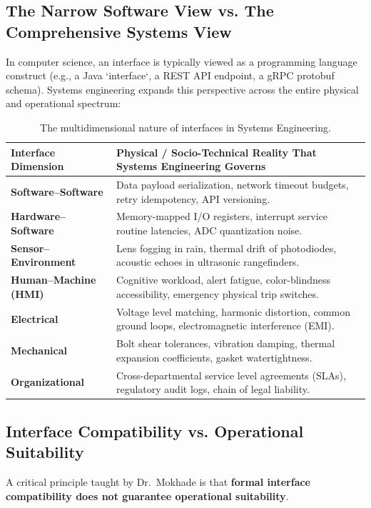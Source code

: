 \subsection{The Narrow Software View vs. The Comprehensive Systems View}
In computer science, an interface is typically viewed as a programming language construct (e.g., a Java `interface`, a REST API endpoint, a gRPC protobuf schema). Systems engineering expands this perspective across the entire physical and operational spectrum:

\begin{table}[htbp]
\centering
\small
\renewcommand{\arraystretch}{1.3}
\begin{tabularx}{\textwidth}{p{3.5cm}X}
\toprule
\textbf{Interface Dimension} & \textbf{Physical / Socio-Technical Reality That Systems Engineering Governs} \\
\midrule
\textbf{Software--Software} & Data payload serialization, network timeout budgets, retry idempotency, API versioning. \\
\textbf{Hardware--Software} & Memory-mapped I/O registers, interrupt service routine latencies, ADC quantization noise. \\
\textbf{Sensor--Environment} & Lens fogging in rain, thermal drift of photodiodes, acoustic echoes in ultrasonic rangefinders. \\
\textbf{Human--Machine (HMI)} & Cognitive workload, alert fatigue, color-blindness accessibility, emergency physical trip switches. \\
\textbf{Electrical} & Voltage level matching, harmonic distortion, common ground loops, electromagnetic interference (EMI). \\
\textbf{Mechanical} & Bolt shear tolerances, vibration damping, thermal expansion coefficients, gasket watertightness. \\
\textbf{Organizational} & Cross-departmental service level agreements (SLAs), regulatory audit logs, chain of legal liability. \\
\bottomrule
\end{tabularx}
\caption{The multidimensional nature of interfaces in Systems Engineering.}
\label{tab:interface_dimensions}
\end{table}

\subsection{Interface Compatibility vs. Operational Suitability}
A critical principle taught by Dr.~Mokhade is that \textbf{formal interface compatibility does not guarantee operational suitability}.

